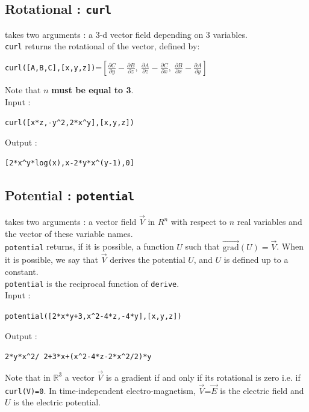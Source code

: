 \documentclass[a4paper,11pt]{book}
\newcommand{\R}{{\mathbb{R}}}
\begin{document}
\subsection{Rotational : {\tt curl}}
  takes two arguments : a 3-d vector field
depending on 3 variables.\\
{\tt curl} returns the rotational of the vector, defined by:
\begin{center}
{\tt curl([A,B,C],[x,y,z])}=$\displaystyle [\frac{\partial C}{\partial y}-\frac{\partial B}{\partial z},\ \frac{\partial A}{\partial z}-\frac{\partial C}{\partial x},\ \frac{\partial B}{\partial x}-\frac{\partial A}{\partial y}]$
\end{center}
Note that $n$ {\bf must be equal to 3}.\\
Input :
\begin{center}{\tt curl([x*z,-y\verb|^|2,2*x\verb|^|y],[x,y,z])}\end{center}
Output :
\begin{center}{\tt [2*x\verb|^|y*log(x),x-2*y*x\verb|^|(y-1),0]}\end{center}

\subsection{Potential : {\tt potential}}
 takes two arguments : a vector field
$\overrightarrow V$ in $R^n$ with respect to $n$ real variables 
and the vector of these variable names.\\
{\tt  potential} returns, if it is possible, a function $U$ such that 
$\overrightarrow{\mbox{grad}}(U)=\overrightarrow V$. When it is possible, we
say that $\overrightarrow V$ derives the potential $U$, and
$U$ is defined up to a constant.\\
{\tt  potential} is the reciprocal function of {\tt derive}.\\
Input :
\begin{center}{\tt potential([2*x*y+3,x\verb|^|2-4*z,-4*y],[x,y,z])}\end{center}
Output :
\begin{center}{\tt 2*y*x\verb|^|2/
2+3*x+(x\verb|^|2-4*z-2*x\verb|^|2/2)*y}\end{center}
Note that in $\R^3$ 
a vector $\overrightarrow V$ is a gradient if and only if its 
rotational is zero i.e. if {\tt curl(V)=0}.
In time-independent electro-magnetism, 
$\overrightarrow V$=$\overrightarrow E$ is the
electric field and $U$ is the electric potential.
\end{document}
